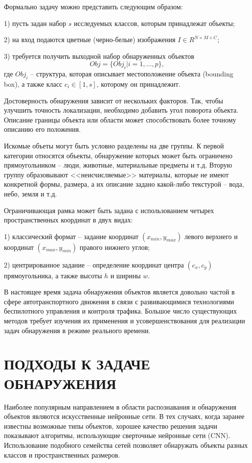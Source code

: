 \documentclass[14pt,a4paper]{extarticle}
\begin{document}
Формально задачу можно представить следующим образом:

1) пусть задан набор $s$ исследуемых классов, которым принадлежат объекты;

2) на вход подаются цветные (черно-белые) изображения $I \in R^{N \times M \times C}$;

3) требуется получить выходной набор обнаруженных объектов 
$$Obj = \{Obj_i | i = 1,..., p\},$$ 
где $Obj_i$ -- структура, которая описывает местоположение объекта (bounding box), а также класс $c_i \in [1, s]$, которому он принадлежит.  

Достоверность обнаружения зависит от нескольких факторов. Так, чтобы улучшить точность локализации, необходимо добавить угол поворота объекта. Описание границы объекта или области может способствовать более точному описанию его положения. 

Искомые объеты могут быть условно разделены на две группы. К первой категории относятся объекты, обнаружение которых может быть ограничено прямоугольником -- люди, животные, материальные предметы и т.д. Вторую группу образовывают <<неисчисляемые>> материалы, которые не имеют конкретной формы, размера, а их описание задано какой-либо текстурой -- вода, небо, земля и т.д.

Ограничивающая рамка может быть задана с использованием четырех пространственных координат в двух видах:

1) классический формат -- задание координат $(x_{min}, y_{max})$ левого верхнего и координат $(x_{max}, y_{min})$ правого нижнего углов;

2) центрированное задание -- определение координат центра $(c_x, c_y)$ прямоугольника, а также высоты $h$ и ширины $w$. 

В настоящее время задача обнаружения объектов является довольно час\-той в сфере автотранспортного движения в связи с развивающимися технологиями беспилотного управления и контроля трафика. Большое число существующих методов требует изучения их применения и усовершенствования для реализации задач обнаружения в режиме реального времени. 

\newpage
\section{ПОДХОДЫ К ЗАДАЧЕ ОБНАРУЖЕНИЯ}
Наиболее популярным направлением в области распознавания и обнаружения объектов являются искусственные нейронные сети. В тех случаях, когда заранее известны возможные типы объектов, хорошее качество решения задачи показывают алгоритмы, использующие сверточные нейронные сети (CNN). Использование подобного семейства сетей позволяет обнаружать объекты разных классов и пространственных размеров. 
\end{document}
